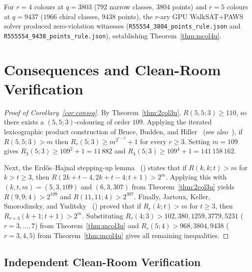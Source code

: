 \documentclass[11pt]{article}
\theoremstyle{remark}
\begin{document}
For $r=4$ colours at $q=3803$ ($792$ narrow classes, $3804$ points) and $r=5$
colours at $q=9437$ ($1966$ chiral classes, $9438$ points), the $r$-ary GPU
WalkSAT+PAWS solver produced zero-violation witnesses
(\texttt{R55554\_3804\_points\_rule.json} and \texttt{R555554\_9438\_points\_rule.json}),
establishing Theorem~\ref{thm:mcol4u}.

\section{Consequences and Clean-Room Verification}\label{sec:conseq}

\begin{proof}[Proof of Corollary~\ref{cor:conseq}]
By Theorem~\ref{thm:2col3u}, $R(5,5;3)\ge 110$, so there exists a $(5,5;3)$-colouring
of order $109$. Applying the iterated lexicographic product construction of
Bruce, Budden, and Hiller~\cite{brbh} (see also~\cite[Section~7.1(a)]{survey}),
if $R(5,5;3)>m$ then $R_r(5;3)\ge m^{2^{r-2}}+1$ for every $r\ge 3$. Setting
$m=109$ gives $R_3(5;3)\ge 109^2+1=11\,882$ and
$R_4(5;3)\ge 109^4+1=141\,158\,162$.

Next, the Erd\H{o}s--Hajnal stepping-up lemma~\cite[p.~106]{grs}
(\cite[Section~7.5(a)]{survey}) states that if $R(k,k;t)>m$ for $k>t\ge 3$, then
$R(2k+t-4,2k+t-4;t+1)>2^m$. Applying this with $(k,t,m)=(5,3,109)$ and
$(6,3,307)$ from Theorem~\ref{thm:2col3u} yields $R(9,9;4)>2^{109}$ and
$R(11,11;4)>2^{307}$. Finally, Jartoux, Keller, Smorodinsky, and
Yuditsky~\cite{jaksy} (\cite[Section~7.5(b)]{survey}) proved that if
$R_r(k;t)>m$ for $t\ge 3$, then $R_{r+3}(k+1;t+1)>2^m$. Substituting
$R_r(4;3)>102,380,1259,3779,5231$ ($r=3,\dots,7$) from
Theorem~\ref{thm:mcol3u} and $R_r(5;4)>968,3804,9438$ ($r=3,4,5$) from
Theorem~\ref{thm:mcol4u} gives all remaining inequalities.
\end{proof}

\subsection{Independent Clean-Room Verification}
\end{document}

